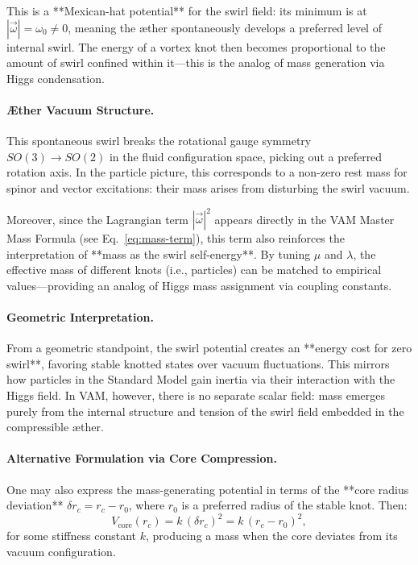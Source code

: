 This is a **Mexican-hat potential** for the swirl field: its minimum is at \( |\vec{\omega}| = \omega_0 \neq 0 \), meaning the æther spontaneously develops a preferred level of internal swirl. The energy of a vortex knot then becomes proportional to the amount of swirl confined within it—this is the analog of mass generation via Higgs condensation.

\vspace{0.5em}
\paragraph{Æther Vacuum Structure.}
This spontaneous swirl breaks the rotational gauge symmetry \( SO(3) \rightarrow SO(2) \) in the fluid configuration space, picking out a preferred rotation axis. In the particle picture, this corresponds to a non-zero rest mass for spinor and vector excitations: their mass arises from disturbing the swirl vacuum.

Moreover, since the Lagrangian term \( |\vec{\omega}|^2 \) appears directly in the VAM Master Mass Formula (see Eq.~\ref{eq:mass-term}), this term also reinforces the interpretation of **mass as the swirl self-energy**. By tuning \( \mu \) and \( \lambda \), the effective mass of different knots (i.e., particles) can be matched to empirical values—providing an analog of Higgs mass assignment via coupling constants.

\vspace{0.5em}
\paragraph{Geometric Interpretation.}
From a geometric standpoint, the swirl potential creates an **energy cost for zero swirl**, favoring stable knotted states over vacuum fluctuations. This mirrors how particles in the Standard Model gain inertia via their interaction with the Higgs field. In VAM, however, there is no separate scalar field: mass emerges purely from the internal structure and tension of the swirl field embedded in the compressible æther.

\vspace{0.5em}
\paragraph{Alternative Formulation via Core Compression.}
One may also express the mass-generating potential in terms of the **core radius deviation** \( \delta r_c = r_c - r_0 \), where \( r_0 \) is a preferred radius of the stable knot. Then:
\begin{equation}
    V_{\text{core}}(r_c) = k\, (\delta r_c)^2 = k\, (r_c - r_0)^2,
\end{equation}
for some stiffness constant \( k \), producing a mass when the core deviates from its vacuum configuration.

